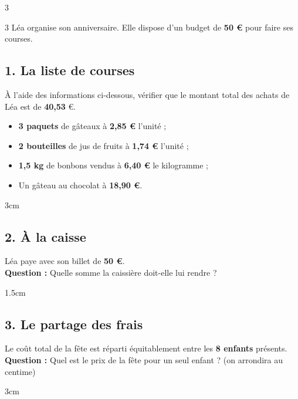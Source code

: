 \documentclass[a4paper]{book}
\begin{document}
{\begin{exerciceNote}{3}
\begin{minipage}{0.45\linewidth}
        \end{minipage}
        \hfill\vline\hfill
        \begin{minipage}{0.45\linewidth}
            \quad {}
            
        \end{minipage}        
    \end{exerciceNote}


    \begin{exerciceNote}{3}
        Léa organise son anniversaire. Elle dispose d'un budget de \textbf{50 €} pour faire ses courses.

        \subsection*{1. La liste de courses}
        À l'aide des informations ci-dessous, vérifier que le montant total des achats de Léa est de \textbf{40,53} €.
        \begin{itemize}
            \item \textbf{3 paquets} de gâteaux à \textbf{2,85 €} l'unité ;
            \item \textbf{2 bouteilles} de jus de fruits à \textbf{1,74 €} l'unité ;
            \item \textbf{1,5 kg} de bonbons vendus à \textbf{6,40 €} le kilogramme ;
            \item Un gâteau au chocolat à \textbf{18,90 €}.
        \end{itemize}
        
        \begin{ZoneReponse}{3cm}
        \end{ZoneReponse}
        
        \subsection*{2. À la caisse}
        Léa paye avec son billet de \textbf{50 €}. 
        \\ \textbf{Question :} Quelle somme la caissière doit-elle lui rendre ?

        \begin{ZoneReponse}{1.5cm}
        \end{ZoneReponse}
        
        \subsection*{3. Le partage des frais}
        Le coût total de la fête est réparti équitablement entre les \textbf{8 enfants} présents.
        \\ \textbf{Question :} Quel est le prix de la fête pour un seul enfant ? (on arrondira au centime)
                \begin{ZoneReponse}{3cm}
        \end{ZoneReponse}
    \end{exerciceNote}


}
\end{document}
